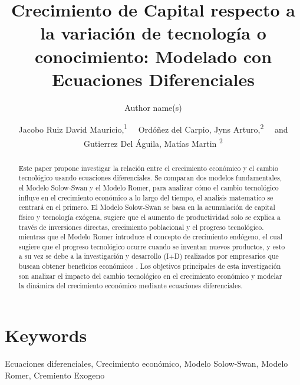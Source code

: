 \documentclass[letterpaper, 10pt]{article}
\newcommand\authormark[1]{\textsuperscript{#1}}
\begin{document}
\title{Crecimiento de Capital respecto a la variación de tecnología o conocimiento: Modelado con Ecuaciones Diferenciales}

\author{Author name(s)}



\author{Jacobo Ruiz David Mauricio,\authormark{1} ~~Ordóñez del Carpio, Jyns Arturo,\authormark{2} ~~and Gutierrez Del Águila, Matías Martin \authormark{2} }

\address{\authormark{1} \href{david.jacobo@utec.edu.pe}{david.jacobo@utec.edu.pe} ~~~~202220396\\
\authormark{2} \\
\authormark{3}
}

\email{\authormark{*}opex@optica.org} %


\begin{abstract}
Este paper propone investigar la relación entre el crecimiento económico y el cambio tecnológico usando ecuaciones diferenciales. Se comparan dos modelos fundamentales, el Modelo Solow-Swan y el Modelo Romer, para analizar cómo el cambio tecnológico influye  en el crecimiento económico a lo largo del tiempo, el analisis matematico se centrará en el primero. El Modelo Solow-Swan se basa en la acumulación de capital físico y tecnología exógena, sugiere que el aumento de productividad solo se explica a través de inversiones directas, crecimiento poblacional y el progreso tecnológico.\cite{Chirwa18} mientras que el Modelo Romer introduce el concepto de crecimiento endógeno, el cual sugiere que el progreso tecnológico ocurre cuando se inventan nuevos productos, y esto a su vez se debe a la investigación y desarrollo (I+D) realizados por empresarios que buscan obtener beneficios económicos \cite{Chu18}. Los objetivos principales de esta investigación son analizar el impacto del cambio tecnológico en el crecimiento económico y modelar la dinámica del crecimiento económico mediante ecuaciones diferenciales.
\end{abstract}

\section*{Keywords}
\begin{flushright}
    Ecuaciones diferenciales, Crecimiento económico, Modelo Solow-Swan, Modelo Romer, Cremiento Exogeno
\end{flushright}
\end{document}

